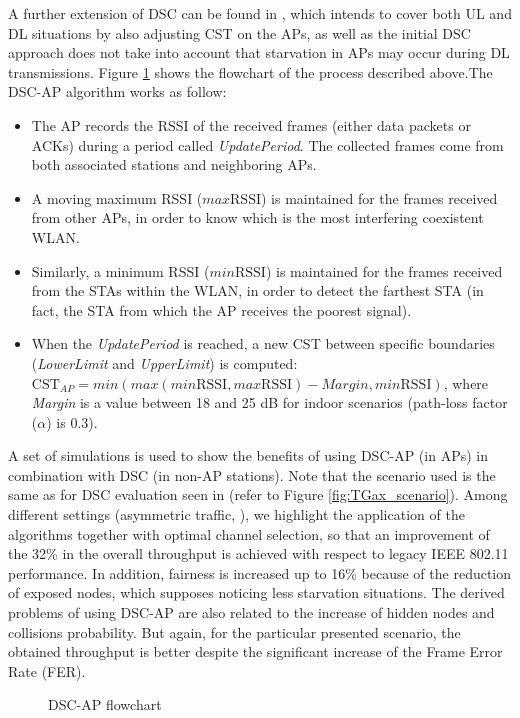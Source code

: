 \documentclass[12pt, a4paper,twoside]{tesi_upf}
\begin{document}
			
						
	
						
			
			
			A further extension of DSC can be found in \cite{afaqui2016dynamic}, which intends to cover both UL and DL situations by also adjusting CST on the APs, as well as the initial DSC approach does not take into account that starvation in APs may occur during DL transmissions. Figure \ref{fig:enhanced_dsc} shows the flowchart of the process described above.The DSC-AP algorithm works as follow:
			\begin{itemize}
				\item The AP records the RSSI of the received frames (either data packets or ACKs) during a period called \textit{UpdatePeriod}. The collected frames come from both associated stations and neighboring APs.
				\item A moving maximum RSSI ($max\mathrm{RSSI}$) is maintained for the frames received from other APs, in order to know which is the most interfering coexistent WLAN.
				\item Similarly, a minimum RSSI ($min\mathrm{RSSI}$) is maintained for the frames received from the STAs within the WLAN, in order to detect the farthest STA (in fact, the STA from which the AP receives the poorest signal).
				\item When the \textit{UpdatePeriod} is reached, a new CST between specific boundaries (\textit{LowerLimit} and \textit{UpperLimit}) is computed:
				$\mathrm{CST}_{AP} = min(max(min\mathrm{RSSI},max\mathrm{RSSI})-Margin,min\mathrm{RSSI})$, where \textit{Margin} is a value between 18 and 25 dB for indoor scenarios (path-loss factor ($\alpha$) is 0.3). 
			\end{itemize}
			
			A set of simulations is used to show the benefits of using DSC-AP (in APs) in combination with DSC (in non-AP stations). Note that the scenario used is the same as for DSC evaluation seen in \cite{afaqui2015evaluation} (refer to Figure \ref{fig:TGax_scenario}). Among different settings (asymmetric traffic, ), we highlight the application of the algorithms together with optimal channel selection, so that an improvement of the 32\% in the overall throughput is achieved with respect to legacy IEEE 802.11 performance. In addition, fairness is increased up to 16\% because of the reduction of exposed nodes, which supposes noticing less starvation situations. The derived problems of using DSC-AP are also related to the increase of hidden nodes and collisions probability. But again, for the particular presented scenario, the obtained throughput is better despite the significant increase of the Frame Error Rate (FER).	
			\begin{figure}[h!]
				\centering
				\caption{DSC-AP flowchart}
				\label{fig:enhanced_dsc}
			\end{figure}
			
\end{document}

